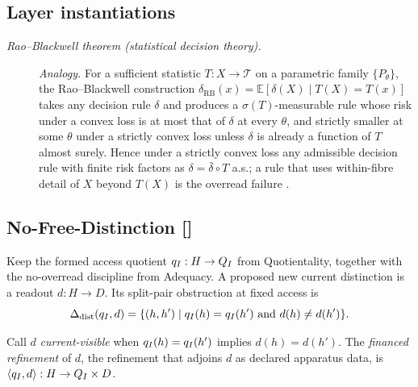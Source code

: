\subsection*{Layer instantiations}\label{layer-inst:F11}

\begingroup\small
\begin{description}
\item[\emph{Rao--Blackwell theorem (statistical decision theory).}] \textit{Analogy.}
For a sufficient statistic \(T:X\to\mathcal T\) on a parametric
family \(\{P_\theta\}\), the Rao--Blackwell construction
\(\delta_{\mathrm{RB}}(x)=\mathbb E[\delta(X)\mid T(X)=T(x)]\) takes any
decision rule \(\delta\) and produces a \(\sigma(T)\)-measurable
rule whose risk under a convex loss is at most that of \(\delta\)
at every \(\theta\), and strictly smaller at some \(\theta\) under a
strictly convex loss unless \(\delta\) is already a function of \(T\)
almost surely.  Hence under a strictly convex loss any admissible
decision rule with finite risk factors as
\(\delta=\bar\delta\circ T\) a.s.; a rule that uses within-fibre
detail of \(X\) beyond \(T(X)\) is the overread failure
\citep{Blackwell1947ConditionalExpectation}.

\end{description}
\endgroup


\subsection{No-Free-Distinction [\texorpdfstring{}{F12}]}\label{sec:access:no-free-distinction}

Keep the formed access quotient \(q_I:H\to Q_I\) from
Quotientality, together with the no-overread discipline from
Adequacy.  A proposed new current distinction is a readout
\(d:H\to D\).  Its split-pair obstruction at fixed access is
\[
  \Delta_{\mathrm{dist}}(q_I,d)
  =
  \{(h,h')\mid q_I(h)=q_I(h')\ \text{and}\ d(h)\ne d(h')\}.
\]

Call \(d\) \emph{current-visible} when \(q_I(h)=q_I(h')\) implies
\(d(h)=d(h')\). The \emph{financed refinement} of \(d\), the refinement that adjoins \(d\)
as declared apparatus data, is
\(\langle q_I,d\rangle:H\to Q_I\times D\).

